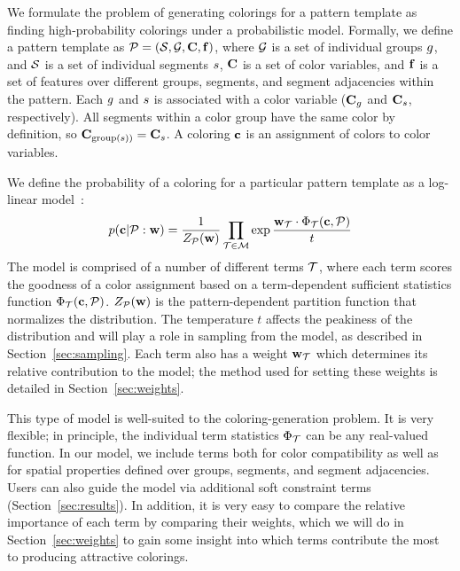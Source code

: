 
We formulate the problem of generating colorings for a pattern template as finding high-probability colorings under a probabilistic model. Formally, we define a pattern template as $\mathcal{P} = (\mathcal{S}, \mathcal{G}, \mathbf{C}, \mathbf{f})$, where $\mathcal{G}$ is a set of individual groups $g$, and $\mathcal{S}$ is a set of individual segments $s$, $\mathbf{C}$ is a set of color variables, and $\mathbf{f}$ is a set of features over different groups, segments, and segment adjacencies within the pattern. Each $g$ and $s$ is associated with a color variable ($\mathbf{C}_g$ and $\mathbf{C}_s$, respectively). All segments within a color group have the same color by definition, so $\mathbf{C}_{\text{group}(s))} = \mathbf{C}_s$. A coloring $\mathbf{c}$ is an assignment of colors to color variables.

We define the probability of a coloring for a particular pattern template as a log-linear model~\cite{LogLinearModels}:  
\begin{equation*}
 p(\mathbf{c} | \mathcal{P} : \mathbf{w}) = \frac{1}{Z_{\mathcal{P}}(\mathbf{w})} \prod_{\mathcal{T} \in \mathcal{M}} \exp{\frac{ \mathbf{w}_{\mathcal{T}}\cdot \Phi_{\mathcal{T}}(\mathbf{c}, \mathcal{P})}{t}}
\end{equation*}
The model is comprised of a number of different terms $\mathcal{T}$, where each term scores the goodness of a color assignment based on a term-dependent sufficient statistics function $\Phi_{\mathcal{T}}(\mathbf{c},\mathcal{P})$. $Z_{\mathcal{P}}(\mathbf{w})$ is the pattern-dependent partition function that normalizes the distribution. The temperature $t$ affects the peakiness of the distribution and will play a role in sampling from the model, as described in Section~\ref{sec:sampling}. Each term also has a weight $\mathbf{w}_{\mathcal{T}}$ which determines its relative contribution to the model; the method used for setting these weights is detailed in Section~\ref{sec:weights}.

This type of model is well-suited to the coloring-generation problem. It is very flexible; in principle, the individual term statistics $\Phi_{\mathcal{T}}$ can be any real-valued function. In our model, we include terms both for color compatibility as well as for spatial properties defined over groups, segments, and segment adjacencies. Users can also guide the model via additional soft constraint terms (Section~\ref{sec:results}). In addition, it is very easy to compare the relative importance of each term by comparing their weights, which we will do in Section~\ref{sec:weights} to gain some insight into which terms contribute the most to producing attractive colorings. 

